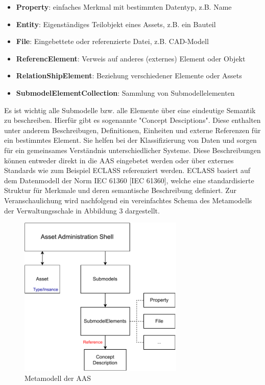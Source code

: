 \begin{itemize}
    \item \textbf{Property}: einfaches Merkmal mit bestimmten Datentyp, z.B. Name
    \item \textbf{Entity}: Eigenständiges Teilobjekt eines Assets, z.B. ein Bauteil 
    \item \textbf{File}: Eingebettete oder referenzierte Datei, z.B. CAD-Modell
    \item \textbf{ReferencElement}: Verweis auf anderes (externes) Element oder Objekt
    \item \textbf{RelationShipElement}: Beziehung verschiedener Elemente oder Assets
    \item \textbf{SubmodelElementCollection}: Sammlung von Submodellelementen
\end{itemize}

Es ist wichtig alle Submodelle bzw. alle Elemente über eine eindeutige Semantik zu beschreiben.
Hierfür gibt es sogenannte "Concept Desciptions". Diese enthalten unter anderem Beschreibugen, Definitionen, Einheiten und externe Referenzen für ein bestimmtes Element.
Sie helfen bei der Klassifizierung von Daten und sorgen für ein gemeinsames Verständnis unterschiedlicher Systeme.
Diese Beschreibungen können entweder direkt in die AAS eingebetet werden oder über externes Standards wie zum Beispiel ECLASS referenziert werden.
ECLASS basiert auf dem Datenmodell der Norm IEC 61360 [IEC 61360], welche eine standardisierte Struktur für Merkmale und deren semantische Beschreibung definiert.
Zur Veranschaulichung wird nachfolgend ein vereinfachtes Schema des Metamodells der Verwaltungsschale in Abbildung 3 dargestellt. \cite{SpezifikationPart1}

\begin{figure}[htbp]
    \centering
    \includegraphics[width=0.7\textwidth]{Bilder/Metamodel.pdf}
    \caption{Metamodell der AAS}
    \label{fig:klassifizierungDT}
\end{figure}

